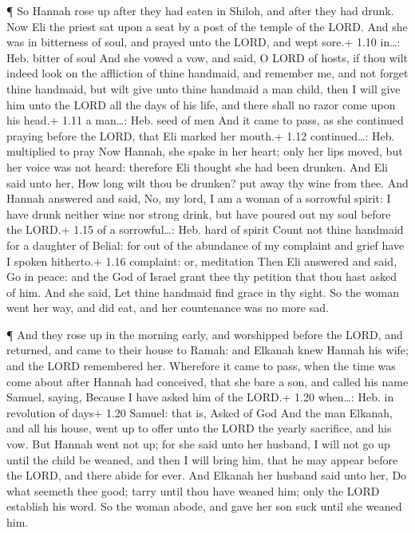  ¶ So Hannah rose up after they had eaten in Shiloh, and
after they had drunk. Now Eli the priest sat upon a seat by a post of
the temple of the LORD.  And she was in bitterness of soul,
and prayed unto the LORD, and wept sore.+ 1.10 in\ldots: Heb. bitter of
soul  And she vowed a vow, and said, O LORD of hosts, if
thou wilt indeed look on the affliction of thine handmaid, and remember
me, and not forget thine handmaid, but wilt give unto thine handmaid a
man child, then I will give him unto the LORD all the days of his life,
and there shall no razor come upon his head.+ 1.11 a man\ldots: Heb.
seed of men  And it came to pass, as she continued praying
before the LORD, that Eli marked her mouth.+ 1.12 continued\ldots: Heb.
multiplied to pray  Now Hannah, she spake in her heart;
only her lips moved, but her voice was not heard: therefore Eli thought
she had been drunken.  And Eli said unto her, How long wilt
thou be drunken? put away thy wine from thee.  And Hannah
answered and said, No, my lord, I am a woman of a sorrowful spirit: I
have drunk neither wine nor strong drink, but have poured out my soul
before the LORD.+ 1.15 of a sorrowful\ldots: Heb. hard of spirit
 Count not thine handmaid for a daughter of Belial: for out
of the abundance of my complaint and grief have I spoken hitherto.+ 1.16
complaint: or, meditation  Then Eli answered and said, Go
in peace: and the God of Israel grant thee thy petition that thou hast
asked of him.  And she said, Let thine handmaid find grace
in thy sight. So the woman went her way, and did eat, and her
countenance was no more sad.

 ¶ And they rose up in the morning early, and worshipped
before the LORD, and returned, and came to their house to Ramah: and
Elkanah knew Hannah his wife; and the LORD remembered her. 
Wherefore it came to pass, when the time was come about after Hannah had
conceived, that she bare a son, and called his name Samuel, saying,
Because I have asked him of the LORD.+ 1.20 when\ldots: Heb. in
revolution of days+ 1.20 Samuel: that is, Asked of God  And
the man Elkanah, and all his house, went up to offer unto the LORD the
yearly sacrifice, and his vow.  But Hannah went not up; for
she said unto her husband, I will not go up until the child be weaned,
and then I will bring him, that he may appear before the LORD, and there
abide for ever.  And Elkanah her husband said unto her, Do
what seemeth thee good; tarry until thou have weaned him; only the LORD
establish his word. So the woman abode, and gave her son suck until she
weaned him.

